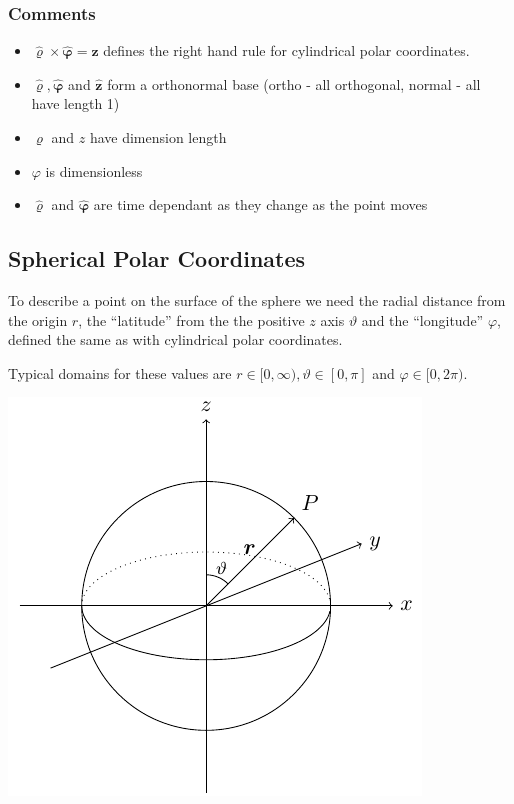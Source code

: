 \documentclass{article}
\newcommand{\vh}[1]{\vec{\hat{#1}}}
\renewcommand{\vec}[1]{\bm{#1}}
\begin{document}
\subsubsection*{Comments}
\begin{itemize}
\item \(\vh\varrho\times\vh\varphi=\vh z\) defines the right hand rule for cylindrical polar coordinates.
\item \(\vh\varrho,\vh\varphi\) and \(\vh z\) form a orthonormal base (ortho - all orthogonal, normal - all have length 1)
\item \(\varrho\) and \(z\) have dimension length
\item \(\varphi\) is dimensionless
\item \(\vh\varrho\) and \(\vh\varphi\) are time dependant as they change as the point moves
\end{itemize}

\subsection*{Spherical Polar Coordinates}

To describe a point on the surface of the sphere we need the radial distance from the origin \(r\), the ``latitude'' from the the positive \(z\) axis \(\vartheta\) and the ``longitude'' \(\varphi\), defined the same as with cylindrical polar coordinates.

Typical domains for these values are \(r\in[0,\infty),\vartheta\in[0,\pi]\) and \(\varphi\in[0,2\pi)\).

\begin{center}
\includegraphics[scale=0.4]{SphericalPolarCoordinates}
\end{center}
\end{document}
